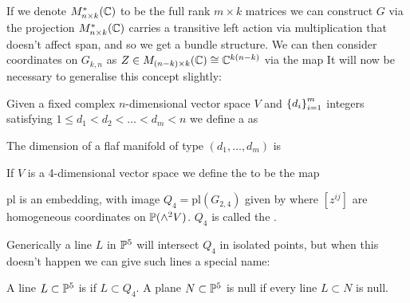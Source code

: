 \documentclass{article}
\begin{document}
If we denote $M^\ast_{n \times k}(\mathbb{C})$ to be the full rank $m \times k$ matrices we can construct $G$ via the projection 
$M^\ast_{n \times k}(\mathbb{C})$ carries a transitive left action via multiplication that doesn't affect span, and so we get a bundle structure. We can then consider coordinates on $G_{k,n}$ as $Z \in M_{(n-k) \times k}(\mathbb{C})\cong \mathbb{C}^{k(n-k)}$ via the map 
It will now be necessary to generalise this concept slightly:
\begin{definition}
	Given a fixed complex $n$-dimensional vector space $V$ and $\left\{ d_i \right\}_{i=1}^m$ integers satisfying $1 \leq d_1 < d_2 < \dots < d_m < n$ we define a  as 
\end{definition}

\begin{lemma}
	The dimension of a flaf manifold of type $(d_1, \dots, d_m)$ is 
\end{lemma}

\begin{definition}
	If $V$ is a 4-dimensional vector space we define the  to be the map 
\end{definition}

\begin{theorem}
	$\text{pl}$ is an embedding, with image $Q_4 = \text{pl}(G_{2,4})$ given by 
where $[z^{ij}]$ are homogeneous coordinates on $\mathbb{P}(\wedge^2 V)$. $Q_4$ is called the . 
\end{theorem}

Generically a line $L$ in $\mathbb{P}^5$ will intersect $Q_4$ in isolated points, but when this doesn't happen we can give such lines a special name:
\begin{definition}
	A line $L \subset \mathbb{P}^5$ is  if $L \subset Q_4$. A plane $N \subset \mathbb{P}^5$ is null if every line $L\subset N$ is null. 
\end{definition}
\end{document}
